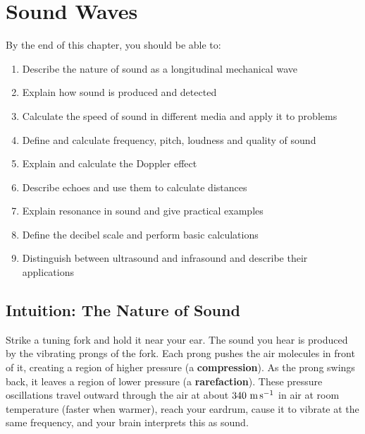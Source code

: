 %

\chapter{Sound Waves}
\label{ch:sound}
\minitoc
\newpage


\begin{objectivebox}
By the end of this chapter, you should be able to:
\begin{enumerate}[noitemsep]
  \item Describe the nature of sound as a longitudinal
  mechanical wave
  \item Explain how sound is produced and detected
  \item Calculate the speed of sound in different
  media and apply it to problems
  \item Define and calculate frequency, pitch, loudness
  and quality of sound
  \item Explain and calculate the Doppler effect
  \item Describe echoes and use them to calculate
  distances
  \item Explain resonance in sound and give practical
  examples
  \item Define the decibel scale and perform basic
  calculations
  \item Distinguish between ultrasound and infrasound
  and describe their applications
\end{enumerate}
\end{objectivebox}

\section{Intuition: The Nature of Sound}

Strike a tuning fork and hold it near your ear. The
sound you hear is produced by the vibrating prongs of
the fork. Each prong pushes the air molecules in front
of it, creating a region of higher pressure (a
\textbf{compression}). As the prong swings back, it
leaves a region of lower pressure (a
\textbf{rarefaction}). These pressure oscillations
travel outward through the air at about
$340\ \text{m\,s}^{-1}$ in air at room temperature (faster when warmer),
reach your eardrum, cause it
to vibrate at the same frequency, and your brain
interprets this as sound.

